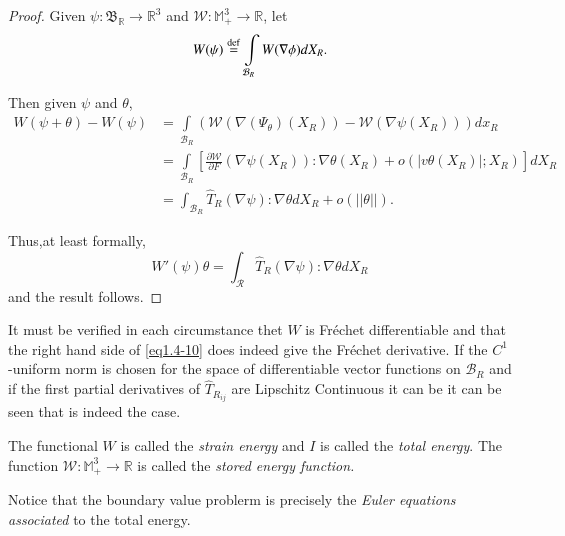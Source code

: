 \begin{proof}
  Given $\psi : \mathfrak{B}_\mathbb{R} \rightarrow \mathbb{R}^3$ and
  $\mathcal{W} : \mathbb{M}^3_+ \rightarrow \mathbb{R}$, let  
  $$
  W(\psi)\overset{\operatorname{def}}{=} \int\limits_{\mathcal{B}_R} W(\nabla\phi)dX_R. 
  $$
  
  Then given $\psi$ and $\theta$, 
  \begin{align*}
    W(\psi + \theta ) - W ( \psi ) & = \int\limits_{\mathcal{B}_{R}} (
    \mathcal{W} ( \nabla ( \Psi _ \theta ) ( X_R))- \mathcal{W} (
    \nabla \psi ( X_R))) dx_R\\ 
    &= \int\limits_{\mathcal {B}_{R}} \left[ \frac{\partial
        \mathcal{W}}{\partial F}( \nabla \psi(X_R)): \nabla
      \theta (X_R) + o ( | v \theta (X_R) | ; X_R)\right]dX_R\\ 
    &=\int_{\mathcal {B}_{R}} \hat{T}_R ( \nabla \psi ) : \nabla
    \theta dX_R + o (|| \theta || ).  
  \end{align*}

  Thus,\pageoriginale at least formally, 
  \begin{equation*}
    W' ( \psi ) \theta = \int_{\mathcal {R}} \hat{T}_R ( \nabla
    \psi): \nabla \theta dX_R \tag{1.4-10} \label{eq1.4-10}
  \end{equation*}
  and the result follows. 
\end{proof}

\begin{remark}\label{chap1-rem1.4.1}
It must be verified in each circumstance thet $W$ is Fr\'echet
differentiable and that the right hand side of \eqref{eq1.4-10} does indeed
give the Fr\'echet derivative. If the $C^1$-uniform norm is chosen for
the space of differentiable vector functions on $\mathcal {B}_{R}$ and
if the first partial derivatives of $\hat{T}_{R_{ij}} $ are Lipschitz
Continuous it can be it can be seen that is indeed the case.  
\end{remark}

The functional $W$ is called the \textit{strain
  energy} and $I$ is
called the \textit{total energy}. The function $\mathcal{W} :
\mathbb{M}_+^3 \to \mathbb{R}$ is called the \textit{stored energy
function.}  

Notice that the boundary value problerm is precisely the \textit{Euler
  equations associated} to the total energy.  

